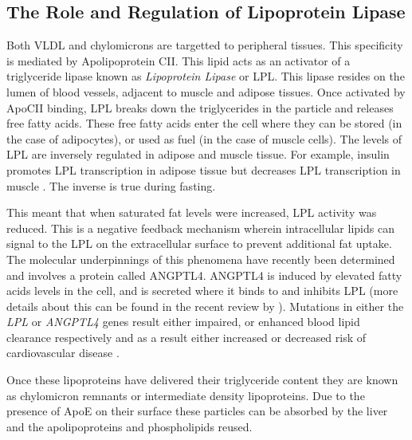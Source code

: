 \documentclass{tufte-handout}
\begin{document}
\subsection{The Role and Regulation of Lipoprotein Lipase}

Both VLDL and chylomicrons are targetted to peripheral tissues.  This specificity is mediated by Apolipoprotein CII.  This lipid acts as an activator of a triglyceride lipase known as \emph{Lipoprotein Lipase} or LPL.  This lipase resides on the lumen of blood vessels, adjacent to muscle and adipose tissues.  Once activated by ApoCII binding, LPL breaks down the triglycerides in the particle and releases free fatty acids.  These free fatty acids enter the cell where they can be stored (in the case of adipocytes), or used as fuel (in the case of muscle cells).  The levels of LPL are inversely regulated in adipose and muscle tissue.  For example, insulin promotes LPL transcription in adipose tissue but decreases LPL transcription in muscle \citep{Spooners1979}.  The inverse is true during fasting.

  This meant that when saturated fat levels were increased, LPL activity was reduced.  This is a negative feedback mechanism wherein intracellular lipids can signal to the LPL on the extracellular surface to prevent additional fat uptake.  The molecular underpinnings of this phenomena have recently been determined and involves a protein called ANGPTL4.  ANGPTL4 is induced by elevated fatty acids levels in the cell, and is secreted where it binds to and inhibits LPL (more details about this can be found in the recent review by \citet{Dijk2014}).  Mutations in either the \textit{LPL} or \textit{ANGPTL4} genes result either impaired, or enhanced blood lipid clearance respectively and as a result either increased or decreased risk of cardiovascular disease \citep{Article2016b}.

  Once these lipoproteins have delivered their triglyceride content they are known as chylomicron remnants or intermediate density lipoproteins.  Due to the presence of ApoE on their surface these particles can be absorbed by the liver and the apolipoproteins and phospholipids reused.
\end{document}
